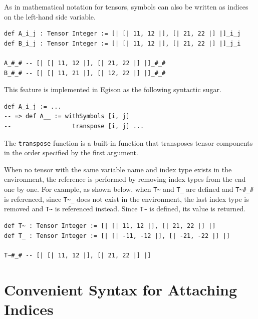 As in mathematical notation for tensors, symbols can also be written as indices on the left-hand side variable.
\begin{lstlisting}[language=egison,numbers=none]
def A_i_j : Tensor Integer := [| [| 11, 12 |], [| 21, 22 |] |]_i_j
def B_i_j : Tensor Integer := [| [| 11, 12 |], [| 21, 22 |] |]_j_i

A_#_# -- [| [| 11, 12 |], [| 21, 22 |] |]_#_#
B_#_# -- [| [| 11, 21 |], [| 12, 22 |] |]_#_#
\end{lstlisting}
This feature is implemented in Egison as the following syntactic sugar.
\begin{lstlisting}[language=egison,numbers=none]
def A_i_j := ...
-- => def A__ := withSymbols [i, j]
--                 transpose [i, j] ...
\end{lstlisting}
The \lstinline{transpose} function is a built-in function that transposes tensor components in the order specified by the first argument.

When no tensor with the same variable name and index type exists in the environment, the reference is performed by removing index types from the end one by one.
For example, as shown below, when \lstinline{T~} and \lstinline{T_} are defined and \lstinline{T~#_#} is referenced, since \lstinline{T~_} does not exist in the environment, the last index type is removed and \lstinline{T~} is referenced instead.
Since \lstinline{T~} is defined, its value is returned.
\begin{lstlisting}[language=egison,numbers=none]
def T~ : Tensor Integer := [| [| 11, 12 |], [| 21, 22 |] |]
def T_ : Tensor Integer := [| [| -11, -12 |], [| -21, -22 |] |]

T~#_# -- [| [| 11, 12 |], [| 21, 22 |] |]
\end{lstlisting}

\section{Convenient Syntax for Attaching Indices}\label{tensor-refs}

